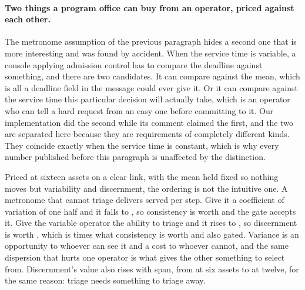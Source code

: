 \documentclass[11pt]{article}
\begin{document}
\paragraph{Two things a program office can buy from an operator, priced against each other.} The
metronome assumption of the previous paragraph hides a second one that is more interesting and was
found by accident. When the service time is variable, a console applying admission control has to
compare the deadline against something, and there are two candidates. It can compare against the
mean, which is all a deadline field in the message could ever give it. Or it can compare against the
service time this particular decision will actually take, which is an operator who can tell a hard
request from an easy one before committing to it. Our implementation did the second while its
comment claimed the first, and the two are separated here because they are requirements of
completely different kinds. They coincide exactly when the service time is constant, which is why
every number published before this paragraph is unaffected by the distinction.

Priced at sixteen assets on a clear link, with the mean held fixed so nothing moves but variability
and discernment, the ordering is not the intuitive one. A metronome that cannot triage delivers
\FsMetro{} served per step. Give it a coefficient of variation of one half and it falls to
\FsNoisy{}, so consistency is worth \FsConsistency{} and the gate accepts it. Give the variable
operator the ability to triage and it rises to \FsSeeing{}, so discernment is worth \FsDiscernment{},
which is \FsRatio{} times what consistency is worth and also gated. Variance is an opportunity to
whoever can see it and a cost to whoever cannot, and the same dispersion that hurts one operator is
what gives the other something to select from. Discernment's value also rises with span, from
\FsDiscernSix{} at six assets to \FsDiscernTwelve{} at twelve, for the same reason: triage needs
something to triage away.
\end{document}
